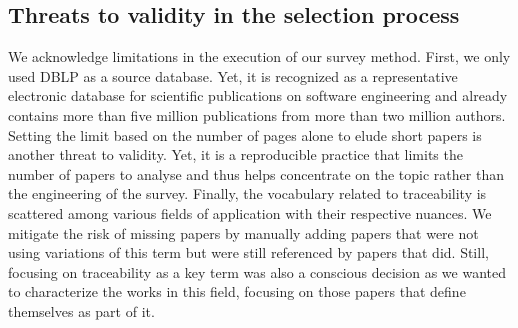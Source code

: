 \subsection{Threats to validity in the selection process}
We acknowledge limitations in the execution of our survey method. 
First, we only used DBLP as a source database. Yet, it is recognized as a {representative} electronic database for scientific publications on software engineering and already contains more than five million publications from more than two million authors.
Setting the limit based on the number of pages alone to elude short papers is another threat to validity. Yet, it is a reproducible practice that limits the number of papers to analyse and thus helps concentrate on the topic rather than the engineering of the survey. 
Finally, the vocabulary related to traceability is scattered among various fields of application with their respective nuances. We mitigate the risk of missing papers by manually adding papers that were not using variations of this term but were still referenced by papers that did. Still, focusing on traceability as a key term was also a conscious decision as we wanted to characterize the works in this field, focusing on those papers that define themselves as part of it. 


%





